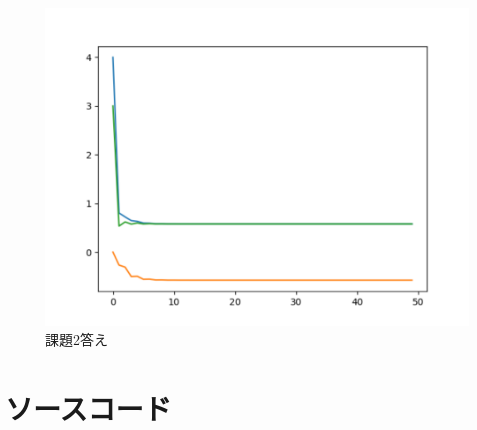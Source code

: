 \documentclass{jsarticle}
\begin{document}
　
　
　
　
　
　
　

\begin{figure}[h]
\begin{center}
\includegraphics[width=.4\linewidth]{kadai1_2ans.pdf}
\hspace*{1mm}
\caption{課題2答え}
\end{center}
\end{figure}

\section{ソースコード}
　
　
　
　
　
　
　
　
　　

\end{document}
